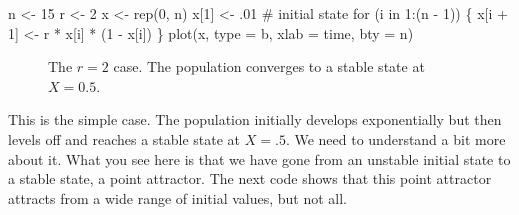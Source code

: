 \documentclass[
  a4paper,
  DIV=11,
  numbers=noendperiod,
  oneside]{scrreprt}
\newenvironment{Shaded}{}{}
\newcommand{\AttributeTok}[1]{\textcolor[rgb]{0.84,0.23,0.29}{#1}}
\newcommand{\CommentTok}[1]{\textcolor[rgb]{0.42,0.45,0.49}{#1}}
\newcommand{\ControlFlowTok}[1]{\textcolor[rgb]{0.84,0.23,0.29}{#1}}
\newcommand{\DecValTok}[1]{\textcolor[rgb]{0.00,0.36,0.77}{#1}}
\newcommand{\FunctionTok}[1]{\textcolor[rgb]{0.44,0.26,0.76}{#1}}
\newcommand{\NormalTok}[1]{\textcolor[rgb]{0.14,0.16,0.18}{#1}}
\newcommand{\OtherTok}[1]{\textcolor[rgb]{0.44,0.26,0.76}{#1}}
\newcommand{\SpecialCharTok}[1]{\textcolor[rgb]{0.00,0.36,0.77}{#1}}
\newcommand{\StringTok}[1]{\textcolor[rgb]{0.01,0.18,0.38}{#1}}
\begin{document}
\begin{Shaded}
\begin{Highlighting}[]
\NormalTok{n }\OtherTok{\textless{}{-}} \DecValTok{15}
\NormalTok{r }\OtherTok{\textless{}{-}} \DecValTok{2}
\NormalTok{x }\OtherTok{\textless{}{-}} \FunctionTok{rep}\NormalTok{(}\DecValTok{0}\NormalTok{, n)}
\NormalTok{x[}\DecValTok{1}\NormalTok{] }\OtherTok{\textless{}{-}}\NormalTok{ .}\DecValTok{01} \CommentTok{\# initial state}
\ControlFlowTok{for}\NormalTok{ (i }\ControlFlowTok{in} \DecValTok{1}\SpecialCharTok{:}\NormalTok{(n }\SpecialCharTok{{-}} \DecValTok{1}\NormalTok{)) \{}
\NormalTok{  x[i }\SpecialCharTok{+} \DecValTok{1}\NormalTok{] }\OtherTok{\textless{}{-}}\NormalTok{ r }\SpecialCharTok{*}\NormalTok{ x[i] }\SpecialCharTok{*}\NormalTok{ (}\DecValTok{1} \SpecialCharTok{{-}}\NormalTok{ x[i])}
\NormalTok{\}}
\FunctionTok{plot}\NormalTok{(x, }\AttributeTok{type =} \StringTok{\textquotesingle{}b\textquotesingle{}}\NormalTok{, }\AttributeTok{xlab =} \StringTok{\textquotesingle{}time\textquotesingle{}}\NormalTok{, }\AttributeTok{bty =} \StringTok{\textquotesingle{}n\textquotesingle{}}\NormalTok{)}
\end{Highlighting}
\end{Shaded}

\begin{figure}


\caption{\label{fig-ch2-img2}The \(r=2\) case. The population converges
to a stable state at \(X=0.5\).}

\end{figure}%

This is the simple case. The population initially develops exponentially
but then levels off and reaches a stable state at \(X = .5\). We need to
understand a bit more about it. What you see here is that we have gone
from an unstable initial state to a stable state, a point attractor. The
next code shows that this point attractor attracts from a wide range of
initial values, but not all.
\end{document}
